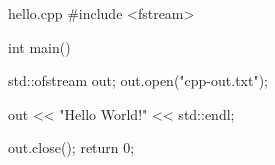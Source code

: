 \documentclass{article}
\begin{document}
\begin{VerbatimOut}{hello.cpp}
#include <fstream>

int main() {
  std::ofstream out;
  out.open("cpp-out.txt");

  out << "Hello World!" << std::endl;

  out.close();
  return 0;
}
\end{VerbatimOut}

\immediate{}
\immediate{}


\end{document}
